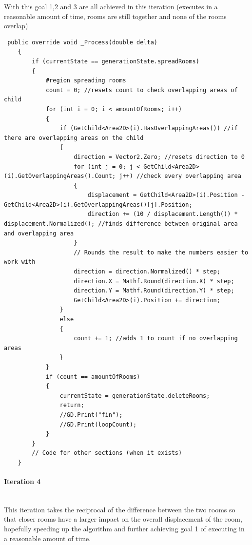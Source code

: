 \documentclass{article}
\newcommand{\parBr}{\vspace{5mm}}%
\newcommand{\myparagraph}[1]{\paragraph{#1}\mbox{}\\} %
\begin{document}
\parBr

With this goal 1,2 and 3 are all achieved in this iteration (executes in a reasonable amount of time, rooms are still together and none of the rooms overlap)
\begin{lstlisting}
 public override void _Process(double delta)
    {
        if (currentState == generationState.spreadRooms)
        {
            #region spreading rooms
            count = 0; //resets count to check overlapping areas of child
            for (int i = 0; i < amountOfRooms; i++)
            {
                if (GetChild<Area2D>(i).HasOverlappingAreas()) //if there are overlapping areas on the child
                {
                    direction = Vector2.Zero; //resets direction to 0
                    for (int j = 0; j < GetChild<Area2D>(i).GetOverlappingAreas().Count; j++) //check every overlapping area
                    {
                        displacement = GetChild<Area2D>(i).Position - GetChild<Area2D>(i).GetOverlappingAreas()[j].Position;
                        direction += (10 / displacement.Length()) * displacement.Normalized(); //finds difference between original area and overlapping area
                    }
                    // Rounds the result to make the numbers easier to work with
                    direction = direction.Normalized() * step;
                    direction.X = Mathf.Round(direction.X) * step;
                    direction.Y = Mathf.Round(direction.Y) * step;
                    GetChild<Area2D>(i).Position += direction;
                }
                else
                {
                    count += 1; //adds 1 to count if no overlapping areas
                }
            }
            if (count == amountOfRooms)
            {
                currentState = generationState.deleteRooms;
                return;
                //GD.Print("fin");
                //GD.Print(loopCount);
            }
		}
		// Code for other sections (when it exists)
	}
\end{lstlisting}

\myparagraph{Iteration 4}
This iteration takes the reciprocal of the difference between the two rooms so that closer rooms have a larger impact on the overall displacement of the room, hopefully speeding up the algorithm and further achieving goal 1 of executing in a reasonable amount of time.

\parBr
\end{document}
